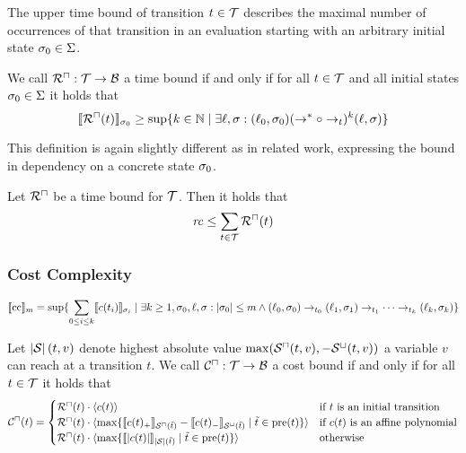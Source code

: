The upper time bound of transition $t \in \mathcal{T}$ describes the maximal number of occurrences of that transition in an evaluation starting with an arbitrary initial state $\sigma_0 \in \Sigma$.

\begin{definition}
  We call ${\mathcal{R}^\sqcap}: \mathcal{T} \rightarrow \mathcal{B}$ a time bound if and only if for all $t \in \mathcal{T}$ and all initial states $\sigma_0 \in \Sigma$ it holds that
  \[ \llbracket {\mathcal{R}^\sqcap}(t) \rrbracket_{\sigma_0} \geq \sup \lbrace  k \in \mathbb{N} \mid \exists \ell, \sigma: (\ell_0, \sigma_0) (\rightarrow^* \circ \rightarrow_t)^k (\ell, \sigma)  \rbrace \]
\end{definition}

This definition is again slightly different as in related work, expressing the bound in dependency on a concrete state $\sigma_0$.

\begin{theorem}
	Let ${\mathcal{R}^\sqcap}$ be a time bound for $\mathcal{T}$.
	Then it holds that 
	\[ \mathit{rc} \leq \sum_{t \in \mathcal{T}}{\mathcal{R}^\sqcap}(t) \]
\end{theorem}

\subsubsection{Cost Complexity}

\begin{definition}
\[ \llbracket \text{cc} \rrbracket_{m} = \sup \lbrace  \sum_{0 \leq i \leq k} \llbracket c(t_i) \rrbracket_{\sigma_i} \mid \exists k \geq 1, \sigma_0, \ell, \sigma: \left|\sigma_0\right| \leq m \wedge
  (\ell_0, \sigma_0) \rightarrow_{t_0} (\ell_1, \sigma_1) \rightarrow_{t_1} \dots \rightarrow_{t_k} (\ell_k, \sigma_k)  \rbrace \]
\end{definition}

\begin{definition}
  Let $\left|\mathcal{S}\right|(t, v)$ denote highest absolute value $\max({\mathcal{S}^\sqcap}(t, v), -{\mathcal{S}^\sqcup}(t, v))$ a variable $v$ can reach at a transition $t$.
  We call ${\mathcal{C}^\sqcap}: \mathcal{T} \rightarrow \mathcal{B}$ a cost bound if and only if for all $t \in \mathcal{T}$ it holds that
  \[ {\mathcal{C}^\sqcap}(t) =
  \begin{cases}
    {\mathcal{R}^\sqcap}(t) \cdot \langle c(t)\rangle & \text{if } t \text{ is an initial transition} \\
    {\mathcal{R}^\sqcap}(t) \cdot \langle\max \lbrace \llbracket c(t)_+ \rrbracket_{{\mathcal{S}^\sqcap}(\tilde{t})} - \llbracket c(t)_- \rrbracket_{{\mathcal{S}^\sqcup}(\tilde{t})} \mid \tilde{t} \in \text{pre}(t) \rbrace\rangle & \text{if } c(t) \text{ is an affine polynomial} \\
    {\mathcal{R}^\sqcap}(t) \cdot \langle\max \lbrace \llbracket \left|c(t)\right| \rrbracket_{\left|\mathcal{S}\right|(\tilde{t})} \mid \tilde{t} \in \text{pre}(t) \rbrace\rangle & \text{otherwise} \\
  \end{cases}
  \]
\end{definition}

